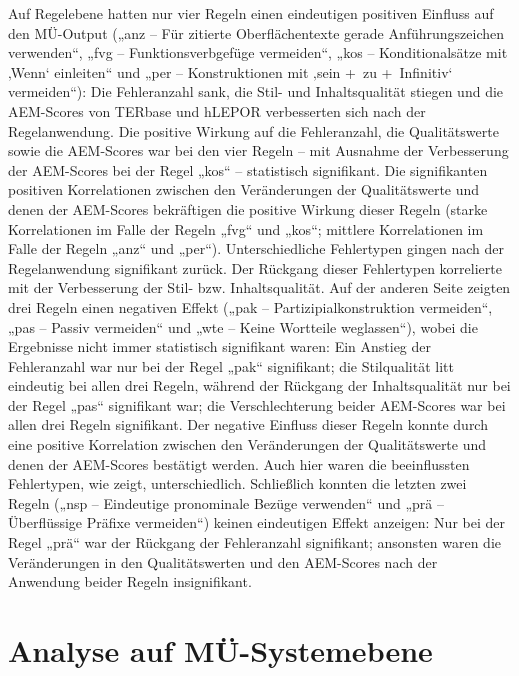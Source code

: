Auf Regelebene hatten nur vier Regeln einen eindeutigen positiven Einfluss auf den MÜ-Output („anz -- Für zitierte Oberflächentexte gerade Anführungszeichen verwenden“, „fvg -- Funktionsverbgefüge vermeiden“, „kos -- Konditionalsätze mit ‚Wenn‘ einleiten“ und „per -- Konstruktionen mit ‚sein +~zu +~Infinitiv‘ vermeiden“): Die Fehleranzahl sank, die Stil- und Inhaltsqualität stiegen und die AEM-Scores von TERbase und hLEPOR verbesserten sich nach der Regelanwendung. Die positive Wirkung auf die Fehleranzahl, die Qualitätswerte sowie die AEM-Scores war bei den vier Regeln -- mit Ausnahme der Verbesserung der AEM-Scores bei der Regel „kos“ -- statistisch signifikant. Die signifikanten positiven Korrelationen zwischen den Veränderungen der Qualitätswerte und denen der AEM-Scores bekräftigen die positive Wirkung dieser Regeln (starke Korrelationen im Falle der Regeln „fvg“ und „kos“; mittlere Korrelationen im Falle der Regeln „anz“ und „per“). Unterschiedliche Fehlertypen gingen nach der Regelanwendung signifikant zurück. Der Rückgang dieser Fehlertypen korrelierte mit der Verbesserung der Stil- bzw. Inhaltsqualität. Auf der anderen Seite zeigten drei Regeln einen negativen Effekt („pak -- Partizipialkonstruktion vermeiden“, „pas -- Passiv vermeiden“ und „wte -- Keine Wortteile weglassen“), wobei die Ergebnisse nicht immer statistisch signifikant waren: Ein Anstieg der Fehleranzahl war nur bei der Regel „pak“ signifikant; die Stilqualität litt eindeutig bei allen drei Regeln, während der Rückgang der Inhaltsqualität nur bei der Regel „pas“ signifikant war; die Verschlechterung beider AEM-Scores war bei allen drei Regeln signifikant. Der negative Einfluss dieser Regeln konnte durch eine positive Korrelation zwischen den Veränderungen der Qualitätswerte und denen der AEM-Scores bestätigt werden. Auch hier waren die beeinflussten Fehlertypen, wie  zeigt, unterschiedlich. Schließlich konnten die letzten zwei Regeln („nsp -- Eindeutige pronominale Bezüge verwenden“ und „prä -- Überflüssige Präfixe vermeiden“) keinen eindeutigen Effekt anzeigen: Nur bei der Regel „prä“ war der Rückgang der Fehleranzahl signifikant; ansonsten waren die Veränderungen in den Qualitätswerten und den AEM-Scores nach der Anwendung beider Regeln insignifikant.

\clearpage %
\section{Analyse auf MÜ-Systemebene}
\label{sec:5.4}


